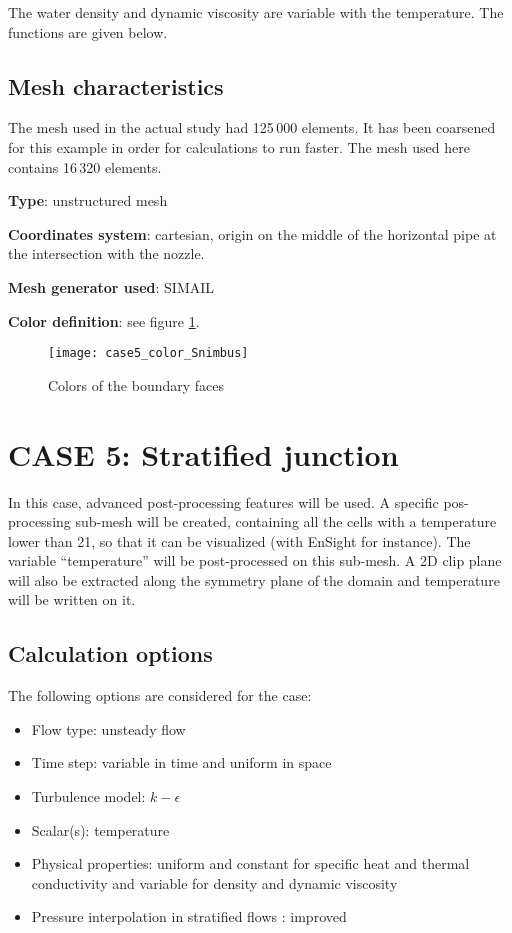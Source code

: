 The water density and dynamic viscosity are variable with the temperature. The
functions are given below.


        \subsection{Mesh characteristics}
The mesh used in the actual study had 125\,000 elements. It has been coarsened
for this example in order for calculations to run faster. The mesh used here
contains 16\,320 elements.

{\bfseries Type}: unstructured mesh

{\bfseries Coordinates system}: cartesian, origin on the middle of the horizontal pipe at the intersection with the nozzle.

{\bfseries Mesh generator used}: SIMAIL

{\bfseries Color definition}: see figure \ref{fige1_e5}.

\begin{figure}[h!]
\begin{center}
\texttt{[image: case5\_color\_Snimbus]}
\caption{Colors of the boundary faces}
\label{fige1_e5}
\end{center}
\end{figure}


\section{CASE 5: Stratified junction}
In this case, advanced post-processing features will be used. A specific
pos-processing sub-mesh will be created, containing all the cells with a
temperature lower than 21\degresC, so that it can be visualized (with EnSight
for instance). The variable ``temperature'' will be post-processed on this
sub-mesh. A 2D clip plane will also be extracted along the symmetry plane of the
domain and temperature will be written on it.


        \subsection{Calculation options}

The following options are considered for the case:
\begin{itemize}
\renewcommand{\labelitemi}{$\rightarrow$}
        \item Flow type: unsteady flow
        \item Time step: variable in time and uniform in space
        \item Turbulence model: $k-\epsilon$
        \item Scalar(s): temperature
        \item Physical properties: uniform and constant for specific heat and
thermal conductivity and variable for density and dynamic viscosity
        \item Pressure interpolation in stratified flows : improved
\end{itemize}


